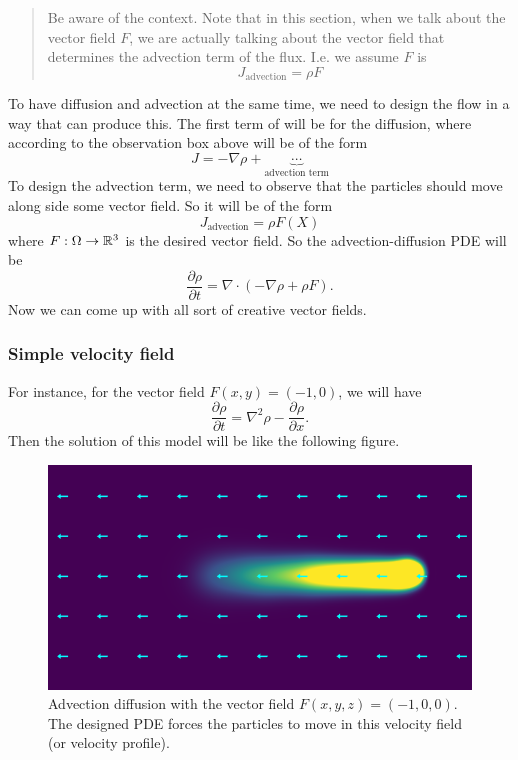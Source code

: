 \begin{quote}
	{\color{red} Be aware of the context.} Note that in this section, when we talk about the vector field $ F $, we are actually talking about the vector field that determines the advection term of the flux. I.e. we assume $ F $ is
	\[ J_\text{advection} = \rho F\]
\end{quote}
To have diffusion and advection at the same time, we need to design the flow in a way that can produce this. The first term of will be for the diffusion, where according to the observation box above will be of the form
\[  J = - \nabla\rho + \underbrace{\cdots}_{\text{advection term}} \]
To design the advection term, we need to observe that the particles should move along side some vector field. So it will be of the form
\[ \boxed{J_\text{advection} = \rho F(X)}  \]
where $ F: \Omega\to \mathbb{R}^3 $ is the desired vector field. So the advection-diffusion PDE will be 
\[ \frac{\partial \rho}{\partial t} = \nabla\cdot (-\nabla\rho + \rho F). \]
Now we can come up with all sort of creative vector fields.
\subsubsection{Simple velocity field}
For instance, for the vector field $ F(x,y)=(-1,0) $, we will have
\[ \frac{\partial \rho}{\partial t} = \nabla^2 \rho - \frac{\partial \rho}{\partial x}.  \]
Then the solution of this model will be like the following figure.
\begin{figure}[h!]
	\centering
	\includegraphics[width=0.7\linewidth]{images/simpleAdvectionDiffusion1}
	\caption{Advection diffusion with the vector field $ F(x,y,z) = (-1,0,0). $ The designed PDE forces the particles to move in this velocity field (or velocity profile).}
	\label{fig:simpleadvectiondiffusion1}
\end{figure}

